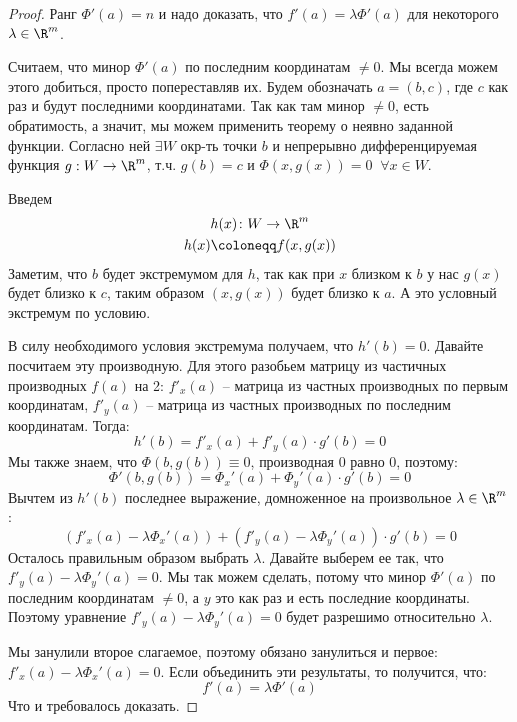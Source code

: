 \begin{proof}
    Ранг $\Phi'(a) = n$ и надо доказать, что $f'(a) = \lambda \Phi'(a)$ для некоторого $\lambda \in \R^m$.

    Считаем, что минор $\Phi'(a)$ по последним координатам $\neq 0$.
    Мы всегда можем этого добиться, просто попереставляв их. 
    Будем обозначать $a = (b, c)$, где $c$ как раз и будут последними координатами.
    Так как там минор $\neq 0$, есть обратимость, а значит, мы можем применить теорему о неявно заданной функции.
    Согласно ней $\exists W$ окр-ть точки $b$ и непрерывно дифференцируемая функция $g: W \to \R^m$, т.ч. $g(b) = c$ и $\Phi(x, g(x)) = 0 \;\; \forall x \in W$.

    Введем \begin{gather*}
        h(x)\colon W \to \R^m \\ h(x) \coloneqq f(x, g(x))
    \end{gather*} 
    Заметим, что $b$ будет экстремумом для $h$, так как при $x$ близком к $b$ у нас $g(x)$ будет близко к $c$, таким образом $(x, g(x))$ будет близко к $a$. А это условный экстремум по условию.

    В силу необходимого условия экстремума получаем, что $h'(b) = 0$.
    Давайте посчитаем эту производную. 
    Для этого разобьем матрицу из частичных производных $f(a)$ на 2: $f'_x(a)$ -- матрица из частных производных по первым координатам, $f'_y(a)$ -- матрица из частных производных по последним координатам.
    Тогда: \[ h'(b) = f'_x(a) + f'_y(a) \cdot g'(b) = 0 \]
    Мы также знаем, что $\Phi(b, g(b)) \equiv 0$, производная 0 равно 0, поэтому: \[ \Phi'(b, g(b)) = \Phi_x'(a) + \Phi_y'(a)\cdot g'(b) = 0  \]
    Вычтем из $h'(b)$ последнее выражение, домноженное на произвольное $\lambda \in \R^m$ : \[ (f'_x(a) - \lambda \Phi_x'(a)) + (f'_y(a) - \lambda \Phi_y'(a))\cdot g'(b) = 0  \]
    Осталось правильным образом выбрать $\lambda$. 
    Давайте выберем ее так, что $f'_y(a) - \lambda \Phi_y'(a) = 0$. 
    Мы так можем сделать, потому что  минор $\Phi'(a)$ по последним координатам $\neq 0$, а $y$ это как раз и есть последние координаты.
    Поэтому уравнение $f'_y(a) - \lambda \Phi_y'(a) = 0$ будет разрешимо относительно $\lambda$.

    Мы занулили второе слагаемое, поэтому обязано занулиться и первое: $f'_x(a) - \lambda \Phi_x'(a) = 0$.
    Если объединить эти результаты, то получится, что: \[ f'(a) = \lambda \Phi'(a) \]
    Что и требовалось доказать.
\end{proof}


